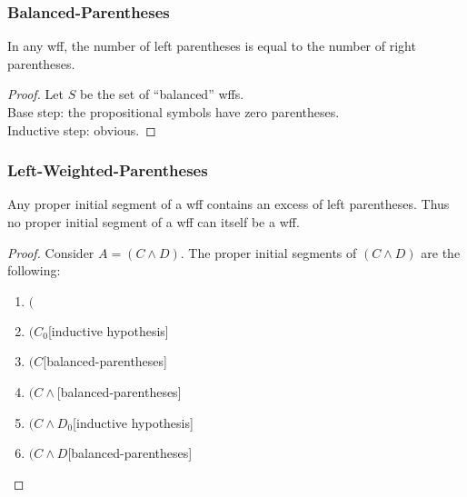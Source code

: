 \documentclass[UTF8,aspectratio=43,11pt,colorlinks,compress,openany]{beamer}%
\begin{document}
\begin{frame}\frametitle{Balanced-Parentheses}
	\begin{corollary}
		In any wff, the number of left parentheses is equal to the number of right parentheses.
	\end{corollary}
	\begin{proof}
		Let $S$ be the set of ``balanced'' wffs.\\
		Base step: the propositional symbols have zero parentheses.\\
		Inductive step: obvious.
	\end{proof}
\end{frame}

\begin{frame}\frametitle{Left-Weighted-Parentheses}
	\begin{lemma}
		Any proper initial segment of a wff contains an excess of left parentheses. Thus no proper initial segment of a wff can itself be a wff.
	\end{lemma}
\setlength\abovedisplayskip{0pt}
\setlength\belowdisplayskip{0pt}
	\begin{proof}
		Consider $A=(C\wedge D)$. The proper initial segments of $(C\wedge D)$ are the following:
		\begin{enumerate}
			\item $($
			\item $(C_0$\hfill [inductive hypothesis]
			\item $(C$\hfill [balanced-parentheses]
			\item $(C\wedge$\hfill [balanced-parentheses]
			\item $(C\wedge D_0$\hfill [inductive hypothesis]
			\item $(C\wedge D$\hfill [balanced-parentheses]
		\end{enumerate}
	\end{proof}
\end{frame}
\end{document}
